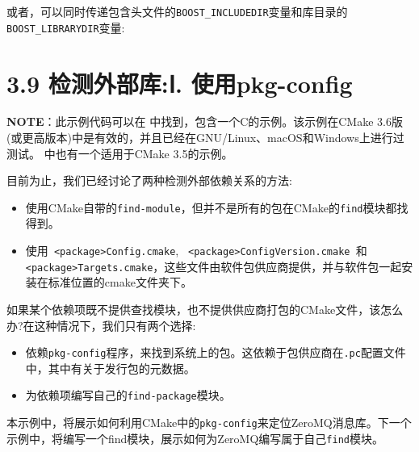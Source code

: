 或者，可以同时传递包含头文件的\texttt{BOOST\_INCLUDEDIR}变量和库目录的\texttt{BOOST\_LIBRARYDIR}变量:



\section{3.9 检测外部库:Ⅰ. 使用pkg-config}

\begin{myInfoBox}
\textbf{NOTE}：此示例代码可以在  中找到，包含一个C的示例。该示例在CMake 3.6版(或更高版本)中是有效的，并且已经在GNU/Linux、macOS和Windows上进行过测试。 中也有一个适用于CMake 3.5的示例。
\end{myInfoBox}

目前为止，我们已经讨论了两种检测外部依赖关系的方法:

\begin{itemize}
\item 使用CMake自带的\texttt{find-module}，但并不是所有的包在CMake的\texttt{find}模块都找得到。

\item 使用\texttt{ <package>Config.cmake}, \texttt{ <package>ConfigVersion.cmake }和\texttt{<package>Targets.cmake}，这些文件由软件包供应商提供，并与软件包一起安装在标准位置的cmake文件夹下。

\end{itemize}

如果某个依赖项既不提供查找模块，也不提供供应商打包的CMake文件，该怎么办?在这种情况下，我们只有两个选择:

\begin{itemize}
\item 依赖\texttt{pkg-config}程序，来找到系统上的包。这依赖于包供应商在\texttt{.pc}配置文件中，其中有关于发行包的元数据。

\item 为依赖项编写自己的\texttt{find-package}模块。

\end{itemize}

本示例中，将展示如何利用CMake中的\texttt{pkg-config}来定位ZeroMQ消息库。下一个示例中，将编写一个find模块，展示如何为ZeroMQ编写属于自己\texttt{find}模块。

